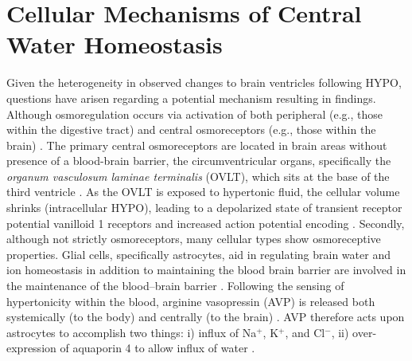 \section{Cellular Mechanisms of Central Water Homeostasis}
Given the heterogeneity in observed changes to brain ventricles following HYPO, questions have arisen regarding a potential mechanism resulting in findings. Although osmoregulation occurs via activation of both peripheral (e.g., those within the digestive tract) and central osmoreceptors (e.g., those within the brain) \cite{bourque_central_2008}. The primary central osmoreceptors are located in brain areas without presence of a blood-brain barrier, the circumventricular organs, specifically the \textit{organum vasculosum laminae terminalis} (OVLT), which sits at the base of the third ventricle \cite{bourque_central_2008}. As the OVLT is exposed to hypertonic fluid, the cellular volume shrinks (intracellular HYPO), leading to a depolarized state of transient receptor potential vanilloid 1 receptors \cite{ciura_hypertonicity_2011} and increased action potential encoding \cite{bourque_central_2008}. Secondly, although not strictly osmoreceptors, many cellular types show osmoreceptive properties. Glial cells, specifically astrocytes, aid in regulating brain water and ion homeostasis in addition to maintaining the blood brain barrier are involved in the maintenance of the blood–brain barrier \cite{simard_neurobiology_2004}. Following the sensing of hypertonicity within the blood, arginine vasopressin (AVP) is released both systemically (to the body) and centrally (to the brain) \cite{simard_neurobiology_2004}. AVP therefore acts upon astrocytes to accomplish two things: i) influx of Na${^+}$, K${^+}$, and Cl${^-}$, ii) over-expression of aquaporin 4 to allow influx of water \cite{simard_neurobiology_2004}.   

